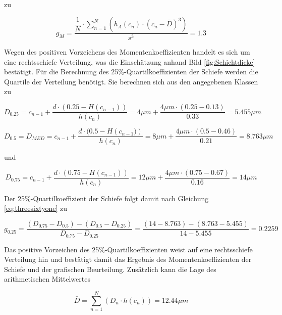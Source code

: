 \noindent zu

\begin{equation}\label{eq:threesixty}
g_{M} =\dfrac{\dfrac{1}{N} \cdot \sum _{n=1}^{N}\left(h_{A} (c_{n})\cdot (c_{n} -\bar{D})^{3} \right)}{s^{3}} =1.3
\end{equation} 

\noindent Wegen des positiven Vorzeichens des Momentenkoeffizienten handelt es sich um eine rechtsschiefe Verteilung, was die Einsch\"{a}tzung anhand Bild \ref{fig:Schichtdicke} best\"{a}tigt. F\"{u}r die Berechnung des 25\%-Quartilkoeffizienten der Schiefe werden die Quartile der Verteilung ben\"{o}tigt. Sie berechnen sich aus den angegebenen Klassen zu

\begin{equation}\label{eq:threesixtyone}
D_{0.25} =c_{n-1} +\dfrac{d\cdot \left(0.25-H(c_{n-1})\right)}{h(c_{n})} =4 \mu m+\dfrac{4 \mu m\cdot (0.25-0.13)}{0.33} =5.455 \mu m
\end{equation} 

\begin{equation}\label{eq:threesixtytwo}
D_{0.5} =D_{MED} =c_{n-1} +\dfrac{d\cdot (0.5-H\left(c_{n-1})\right)}{h(c_{n})} =8 \mu m+\dfrac{4 \mu m\cdot (0.5-0.46)}{0.21} =8.763 \mu m
\end{equation} 

\noindent und

\begin{equation}\label{eq:threesixtythree}
D_{0.75} =c_{n-1} +\dfrac{d\cdot \left(0.75-H(c_{n-1})\right)}{h(c_{n})} =12 \mu m+\dfrac{4 \mu m\cdot (0.75-0.67)}{0.16} =14 \mu m
\end{equation} 

\noindent Der 25\%-Quartilkoeffizient der Schiefe folgt damit nach Gleichung \eqref{eq:threesixtyone} zu

\begin{equation}\label{eq:threesixtyfour}
g_{0.25} =\dfrac{(D_{0.75} -D_{0.5})-(D_{0.5} -D_{0.25})}{D_{0.75} -D_{0.25} } =\dfrac{(14-8.763)-(8.763-5.455)}{14-5.455} = 0.2259
\end{equation} 

\noindent Das positive Vorzeichen des 25\%-Quartilkoeffizienten weist auf eine rechtsschiefe Verteilung hin und best\"{a}tigt damit das Ergebnis des Momentenkoeffizienten der Schiefe und der grafischen Beurteilung. Zus\"{a}tzlich kann die Lage des arithmetischen Mittelwertes 

\begin{equation}\label{eq:threesixtyfive}
\bar{D}=\sum _{n=1}^{N}\left(D_{n} \cdot h(c_{n})\right) =12.44 \mu m
\end{equation} 


